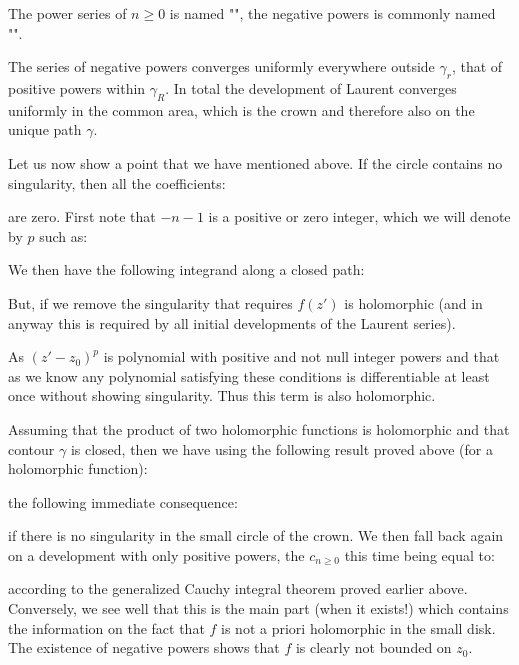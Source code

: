 	The power series of $n\geq 0$ is named "", the negative powers is commonly named "".
	
	The series of negative powers converges uniformly everywhere outside $\gamma_r$, that of positive powers within $\gamma_R$. In total the development of Laurent converges uniformly in the common area, which is the crown and therefore also on the unique path $\gamma$.
	
	Let us now show a point that we have mentioned above. If the circle contains no singularity, then all the coefficients:
	
	are zero. First note that $-n-1$ is a positive or zero integer, which we will denote by $p$ such as:
	
	We then have the following integrand along a closed path:
	
	But, if we remove the singularity that requires $f(z')$ is holomorphic (and in anyway this is required by all initial developments of the Laurent series).
	
	As $(z'-z_0)^p$ is polynomial with positive and not null integer powers and that as we know any polynomial satisfying these conditions is differentiable at least once without showing singularity. Thus this term is also holomorphic.
	
	Assuming that the product of two holomorphic functions is holomorphic and that contour $\gamma$ is closed, then we have using the following result proved above (for a holomorphic function):
	
	the following immediate consequence:
	
	if there is no singularity in the small circle of the crown. We then fall back again on a development with only positive powers, the $c_{n\geq 0}$ this time being equal to:
	
	according to the generalized Cauchy integral theorem proved earlier above. Conversely, we see well that this is the main part (when it exists!) which contains the information on the fact that $f$ is not a priori holomorphic in the small disk. The existence of negative powers shows that $f$ is clearly not bounded on $z_0$.
	
